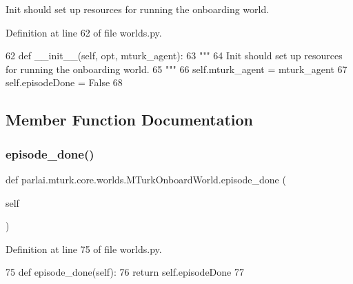 \begin{DoxyVerb}Init should set up resources for running the onboarding world.
\end{DoxyVerb}
 

Definition at line 62 of file worlds.\+py.


\begin{DoxyCode}
62     \textcolor{keyword}{def }\_\_init\_\_(self, opt, mturk\_agent):
63         \textcolor{stringliteral}{"""}
64 \textcolor{stringliteral}{        Init should set up resources for running the onboarding world.}
65 \textcolor{stringliteral}{        """}
66         self.mturk\_agent = mturk\_agent
67         self.episodeDone = \textcolor{keyword}{False}
68 
\end{DoxyCode}


\subsection{Member Function Documentation}
\mbox{\label{classparlai_1_1mturk_1_1core_1_1worlds_1_1MTurkOnboardWorld_aa75a4f3dd42ae431f6cf0e65d3c0eeb7}} 
\subsubsection{\texorpdfstring{episode\+\_\+done()}{episode\_done()}}
{\footnotesize\ttfamily def parlai.\+mturk.\+core.\+worlds.\+M\+Turk\+Onboard\+World.\+episode\+\_\+done (\begin{DoxyParamCaption}\item[{}]{self }\end{DoxyParamCaption})}



Definition at line 75 of file worlds.\+py.


\begin{DoxyCode}
75     \textcolor{keyword}{def }episode\_done(self):
76         \textcolor{keywordflow}{return} self.episodeDone
77 
\end{DoxyCode}
\mbox{\label{classparlai_1_1mturk_1_1core_1_1worlds_1_1MTurkOnboardWorld_ae3f1437a7012ea16489f4c004c420fe6}} 
